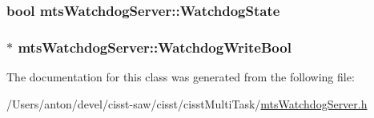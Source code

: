 \subsubsection[{Watchdog\+State}]{\setlength{\rightskip}{0pt plus 5cm}bool mts\+Watchdog\+Server\+::\+Watchdog\+State\hspace{0.3cm}{\ttfamily [protected]}}\label{classmts_watchdog_server_add9a62bd26805a1fe77314242d91efd6}
\hypertarget{classmts_watchdog_server_a89fd0c0ada0929c6804b03a39971a2e3}{}
\subsubsection[{Watchdog\+Write\+Bool}]{$\ast$ mts\+Watchdog\+Server\+::\+Watchdog\+Write\+Bool\hspace{0.3cm}{\ttfamily [protected]}}\label{classmts_watchdog_server_a89fd0c0ada0929c6804b03a39971a2e3}


The documentation for this class was generated from the following file\+:\begin{DoxyCompactItemize}
\item 
/\+Users/anton/devel/cisst-\/saw/cisst/cisst\+Multi\+Task/\hyperlink{mts_watchdog_server_8h}{mts\+Watchdog\+Server.\+h}\end{DoxyCompactItemize}

